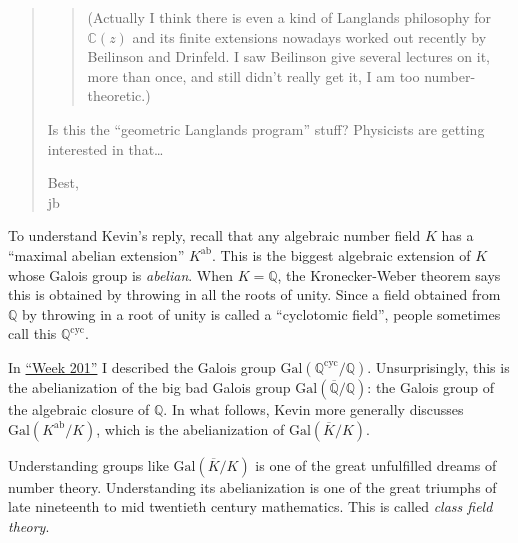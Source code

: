 \documentclass{article}
\renewcommand{\texttt}[1]{%
  \begingroup
  \ttfamily
  \begingroup\lccode`~=`/\lowercase{\endgroup\def~}{/\discretionary{}{}{}}%
  \begingroup\lccode`~=`[\lowercase{\endgroup\def~}{[\discretionary{}{}{}}%
  \begingroup\lccode`~=`.\lowercase{\endgroup\def~}{.\discretionary{}{}{}}%
  \catcode`/=\active\catcode`[=\active\catcode`.=\active
  \scantokens{#1\noexpand}%
  \endgroup
}
\begin{document}
\begin{quote}

\begin{quote}
(Actually I think there is even a kind of Langlands philosophy for
\(\mathbb{C}(z)\) and its finite extensions nowadays worked out recently
by Beilinson and Drinfeld. I saw Beilinson give several lectures on it,
more than once, and still didn't really get it, I am too
number-theoretic.)
\end{quote}

Is this the ``geometric Langlands program'' stuff? Physicists are
getting interested in that\ldots{}

Best,\\
jb
\end{quote}

To understand Kevin's reply, recall that any algebraic number field
\(K\) has a ``maximal abelian extension'' \(K^{\mathrm{ab}}\). This is
the biggest algebraic extension of \(K\) whose Galois group is
\emph{abelian}. When \(K = \mathbb{Q}\), the Kronecker-Weber theorem
says this is obtained by throwing in all the roots of unity. Since a
field obtained from \(\mathbb{Q}\) by throwing in a root of unity is
called a ``cyclotomic field'', people sometimes call this
\(\mathbb{Q}^{\mathrm{cyc}}\).

In \protect\hyperlink{week201}{``Week 201''} I described the Galois
group \(\mathrm{Gal}(\mathbb{Q}^{\mathrm{cyc}}/\mathbb{Q})\).
Unsurprisingly, this is the abelianization of the big bad Galois group
\(\mathrm{Gal}(\overline{\mathbb{Q}}/\mathbb{Q})\): the Galois group of
the algebraic closure of \(\mathbb{Q}\). In what follows, Kevin more
generally discusses \(\mathrm{Gal}(K^{\mathrm{ab}}/K)\), which is the
abelianization of \(\mathrm{Gal}(\overline{K}/K)\).

Understanding groups like \(\mathrm{Gal}(\overline{K}/K)\) is one of the
great unfulfilled dreams of number theory. Understanding its
abelianization is one of the great triumphs of late nineteenth to mid
twentieth century mathematics. This is called \emph{class field theory}.
\end{document}
